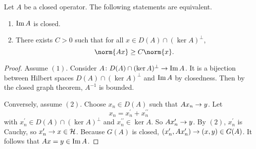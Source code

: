 \documentclass[a4paper,12pt]{article}
\begin{document}
\begin{lem}
    Let $A$ be a closed operator. The following statements are equivalent.
    \begin{enumerate}[label=(\arabic{*})]
        \item $\operatorname{Im} A$ is closed.
        \item There exists $C>0$ such that for all $x \in D(A) \cap (\ker A)^\perp$,
        \begin{equation*}
            \norm{Ax} \geq C\norm{x}.
        \end{equation*}
    \end{enumerate}
\end{lem}
\begin{proof}
    Assume $(1)$. Consider $A \colon D(A) \cap (\ker A)^\perp \rightarrow \operatorname{Im} A$. It is a bijection between Hilbert spaces $D(A) \cap (\ker A)^\perp$ and $\operatorname{Im} A$ by closedness. Then by the closed graph theorem, $A^{-1}$ is bounded.

    Conversely, assume $(2)$. Choose $x_n \in D(A)$ such that $Ax_n \rightarrow y$. Let
    \begin{equation*}
        x_n = x_n^\prime + x_n^{\prime \prime}
    \end{equation*}
    with $x_n^\prime \in D(A) \cap (\ker A)^\perp$ and $x_n^{\prime\prime} \in \ker A$. So $Ax_n^\prime \rightarrow y$. By $(2)$, $x_n^\prime$ is Cauchy, so $x_n^\prime \rightarrow x \in \mathcal{H}$. Because $G(A)$ is closed, $(x_n^\prime,Ax_n^\prime) \rightarrow (x,y) \in G(A)$. It follows that $Ax = y \in \operatorname{Im} A$.
\end{proof}
\end{document}

